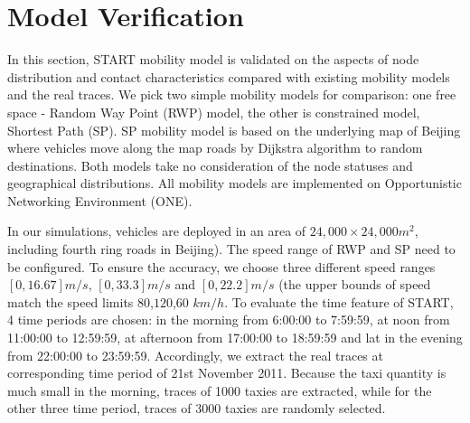 \section{Model Verification}
\label{section_model_varification}
In this section, START mobility model is validated on the aspects of node distribution and contact characteristics compared with existing mobility models and the real traces. We pick two simple mobility models for comparison: one free space - Random Way Point (RWP) model, the other is constrained model, Shortest Path (SP).  SP mobility model is based on the underlying map of Beijing where vehicles move along the map roads by Dijkstra algorithm to random destinations. Both models take no consideration of the node statuses and geographical distributions. All mobility models are implemented on Opportunistic Networking Environment (ONE)\cite{KeranenOtt-155}.

In our simulations, vehicles are deployed in an area of $24,000\times 24,000 m^2$, including fourth ring roads in Beijing). The speed range of RWP and SP need to be configured.
To ensure the accuracy, we choose three different speed ranges $[0,16.67]m/s$, $[0,33.3]m/s$ and $[0,22.2]m/s$ (the upper bounds of speed match the speed limits $80$,$120$,$60$ $km/h$. 
To evaluate the time feature of START, 4 time periods are chosen: in the morning from 6:00:00 to 7:59:59, at noon from 11:00:00 to 12:59:59, at afternoon from 17:00:00 to 18:59:59 and lat in the evening from 22:00:00 to 23:59:59. Accordingly, we extract the real traces at corresponding time period of 21st November 2011. Because the taxi quantity is much small in the morning, traces of 1000 taxies are extracted, while for the other three time period, traces of 3000 taxies are randomly selected. 



